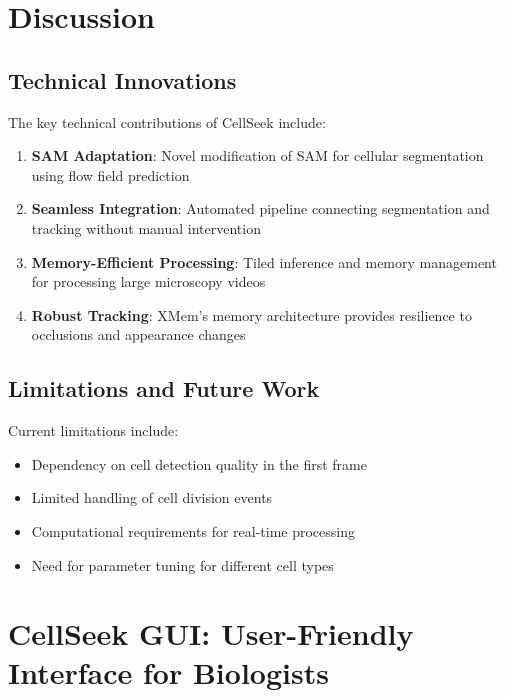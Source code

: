 \documentclass[12pt]{article}
\begin{document}
\section{Discussion}


\subsection{Technical Innovations}

The key technical contributions of CellSeek include:

\begin{enumerate}
  \item \textbf{SAM Adaptation}: Novel modification of SAM for cellular segmentation using flow field prediction
  \item \textbf{Seamless Integration}: Automated pipeline connecting segmentation and tracking without manual intervention
  \item \textbf{Memory-Efficient Processing}: Tiled inference and memory management for processing large microscopy videos
  \item \textbf{Robust Tracking}: XMem's memory architecture provides resilience to occlusions and appearance changes
\end{enumerate}

\subsection{Limitations and Future Work}

Current limitations include:
\begin{itemize}
  \item Dependency on cell detection quality in the first frame
  \item Limited handling of cell division events
  \item Computational requirements for real-time processing
  \item Need for parameter tuning for different cell types
\end{itemize}

\section{CellSeek GUI: User-Friendly Interface for Biologists}
\end{document}
